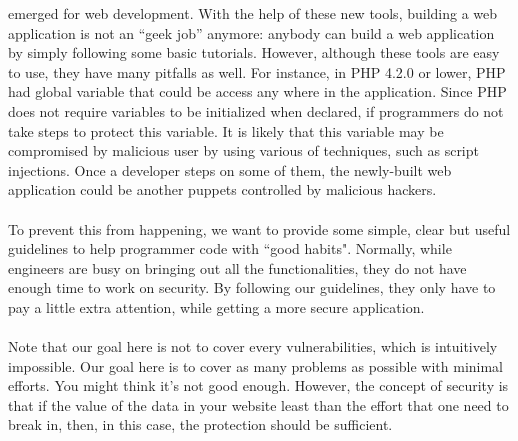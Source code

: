 \documentclass[12pt, a4paper]{article}
\begin{document}
emerged for web development. With the help of these new tools,
building a web application is not an ``geek job'' anymore:
anybody can build a web application by simply following some basic tutorials.
However, although these tools are easy to use,
they have many pitfalls as well. For instance, in PHP 4.2.0 or lower, PHP had global variable that could be access 
any where in the application. Since PHP does not require variables to be initialized when declared, if programmers
do not take steps to protect this variable. It is likely that this variable may be compromised by malicious user by
using various of techniques, such as script injections.
Once a developer steps on some of them, the newly-built web application could
be another puppets controlled by malicious hackers.
\\\\
To prevent this from happening, we want to provide some simple, clear but
useful guidelines to help programmer code with ``good habits".
Normally, while engineers are busy on bringing out all the functionalities,
they do not have enough time to work on security. By following our guidelines,
they only have to pay a little extra attention, while getting a more secure application.
\\\\
Note that our goal here is not to cover every vulnerabilities, which is intuitively impossible.
Our goal here is to cover as many problems as possible with minimal efforts.
You might think it's not good enough.
However, the concept of security is that if the value of the data in your website
least than the effort that one need to break in, then, in this case,
the protection should be sufficient.
%
%
\end{document}
